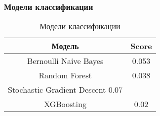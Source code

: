 \subsubsection{Модели классификации}

\begin{table}[H]
  \centering
  \begin{tabular} { | c | c | }
    \hline
    Модель & Score \\
    \hline
    Bernoulli Naive Bayes & 0.053 \\
    Random Forest & 0.038 \\
    Stochastic Gradient Descent 0.07 & \\
    XGBoosting & 0.02 \\
    \hline
  \end{tabular}
  \caption{Модели классификации}
\end{table}
